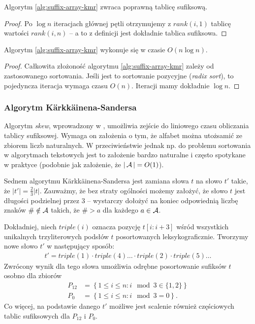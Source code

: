 \begin{corollary}{}{}
  Algorytm \ref{alg:suffix-array-kmr} zwraca poprawną tablicę sufiksową.
\end{corollary}

\begin{proof}
  Po $\log{n}$ iteracjach głównej pętli otrzymujemy z $rank(i, 1)$ tablicę wartości $rank(i, n)$ -- a to z definicji jest dokładnie tablica sufiksowa.
\end{proof}

\begin{theorem}{}{}
  Algorytm \ref{alg:suffix-array-kmr} wykonuje się w czasie $O(n \log{n})$.
\end{theorem}

\begin{proof}
  Całkowita złożoność algorytmu \ref{alg:suffix-array-kmr} zależy od zastosowanego sortowania.
  Jeśli jest to sortowanie pozycyjne (\emph{radix sort}), to pojedyncza iteracja wymaga czasu $O(n)$. Iteracji mamy dokładnie $\log{n}$.
\end{proof}

\subsubsection{Algorytm K\"arkk\"ainena-Sandersa}

Algorytm \emph{skew}, wprowadzony w \citep{karkkainen2003simple}, umożliwia zejście do liniowego czasu obliczania tablicy sufiksowej.
Wymaga on założenia o tym, że alfabet można utożsamić ze zbiorem liczb naturalnych. W przeciwieństwie jednak np. do problemu sortowania w algorytmach tekstowych jest to założenie bardzo naturalne i często spotykane w praktyce (podobnie jak założenie, że $|\operatorname{\mathcal{A}}| = O(1)$).

Sednem algorytmu K\"arkk\"ainena-Sandersa jest zamiana słowa $t$ na słowo $t'$ takie, że $|t'| = \frac{2}{3} |t|$.
Zauważmy, że bez straty ogólności możemy założyć, że słowo $t$ jest długości podzielnej przez $3$ -- wystarczy dołożyć na koniec odpowiednią liczbę znaków $\# \notin \operatorname{\mathcal{A}}$ takich, że $\# > a$ dla każdego $a \in \operatorname{\mathcal{A}}$.

Dokładniej, niech $triple(i)$ oznacza pozycję $t[i:i+3]$ wśród wszystkich unikalnych trzyliterowych podsłów $t$ posortowanych leksykograficznie.
Tworzymy nowe słowo $t'$ w następujący sposób:
\begin{align*}
  t' = triple(1) \cdot triple(4) \ldots \cdot triple(2) \cdot triple(5) \ldots
\end{align*}
Zwrócony wynik dla tego słowa umożliwia odrębne posortowanie sufiksów $t$ osobno dla zbiorów
\begin{align*}
  P_{12} & = \left\{1 \le i \le n: i \mod 3 \in \{1, 2\}\right\} \\
  P_0 & = \left\{1 \le i \le n: i \mod 3 = 0\right\}.
\end{align*}
Co więcej, na podstawie danego $t'$ możliwe jest scalenie również częściowych tablic sufiksowych dla $P_{12}$ i $P_0$.

